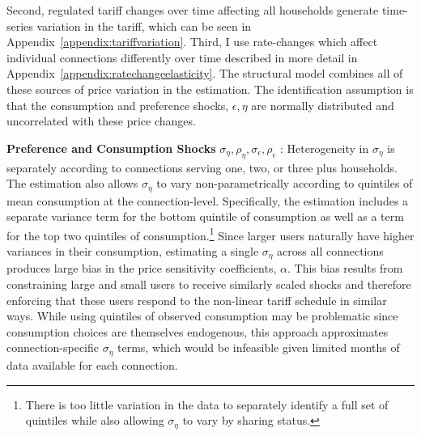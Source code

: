 \documentclass[12pt]{article}
\begin{document}
Second, regulated tariff changes over time affecting all households generate time-series variation in the tariff, which can be seen in Appendix~\ref{appendix:tariffvariation}.  Third, I use rate-changes which affect individual connections differently over time described in more detail in Appendix~\ref{appendix:ratechangeelasticity}.  The structural model combines all of these sources of price variation in the estimation.  The identification assumption is that the consumption and preference shocks, $\epsilon,\eta$ are normally distributed and uncorrelated with these price changes.

\textbf{Preference and Consumption Shocks} $\sigma_{\eta},\rho_{\eta},\sigma_{\epsilon},\rho_{\epsilon}$  :  %
Heterogeneity in $\sigma_{\eta}$ is separately according to connections serving one, two, or three plus households.  The estimation also allows $\sigma_{\eta}$ to vary non-parametrically according to quintiles of mean consumption at the connection-level.  Specifically, the estimation includes a separate variance term for the bottom quintile of consumption as well as a term for the top two quintiles of consumption.\footnote{There is too little variation in the data to separately identify a full set of quintiles while also allowing $\sigma_{\eta}$ to vary by sharing status.}  Since larger users naturally have higher variances in their consumption, estimating a single $\sigma_{\eta}$ across all connections produces large bias in the price sensitivity coefficients, $\alpha$.  This bias results from constraining large and small users to receive similarly scaled shocks and therefore enforcing that these users respond to the non-linear tariff schedule in similar ways.  While using quintiles of observed consumption may be problematic since consumption choices are themselves endogenous, this approach approximates connection-specific $\sigma_{\eta}$ terms, which would be infeasible given limited months of data available for each connection.  
\end{document}
